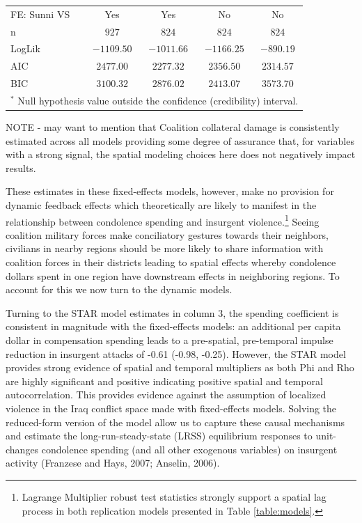 \documentclass[12pt]{article}
\begin{document}
\begin{table}[!h]
\begin{center}
\begin{footnotesize}
\begin{tabular}{l c c c c}
FE: Sunni VS                & Yes               & Yes               & No                & No                  \\
n                           & $927$             & $824$             & $824$             & $824$               \\
LogLik                      & $-1109.50$        & $-1011.66$        & $-1166.25$        & $-890.19$           \\
AIC                         & $2477.00$         & $2277.32$         & $2356.50$         & $2314.57$           \\
BIC                         & $3100.32$         & $2876.02$         & $2413.07$         & $3573.70$           \\
\bottomrule
\multicolumn{5}{l}{\tiny{$^*$ Null hypothesis value outside the confidence (credibility) interval.}}
\end{tabular}
\end{footnotesize}
\end{center}
\end{table}

NOTE - may want to mention that Coalition collateral damage is consistently estimated across all models providing some degree of assurance that, for variables with a strong signal, the spatial modeling choices here does not negatively impact results.

These estimates in these fixed-effects models, however, make no provision for dynamic feedback effects which theoretically are likely to manifest in the relationship between condolence spending and insurgent violence.\footnote{Lagrange Multiplier robust test statistics strongly support a spatial lag process in both replication models presented in Table \ref{table:models}.} Seeing coalition military forces make conciliatory gestures towards their neighbors, civilians in nearby regions should be more likely to share information with coalition forces in their districts leading to spatial effects whereby condolence dollars spent in one region have downstream effects in neighboring regions. To account for this we now turn to the dynamic models.

Turning to the STAR model estimates in column 3, the spending coefficient is consistent in magnitude with the fixed-effects models: an additional per capita dollar in compensation spending leads to a pre-spatial, pre-temporal impulse reduction in insurgent attacks of -0.61 (-0.98, -0.25). However, the STAR model provides strong evidence of spatial and temporal multipliers as both Phi and Rho are highly significant and positive indicating positive spatial and temporal autocorrelation. This provides evidence against the assumption of localized violence in the Iraq conflict space made with fixed-effects models. Solving the reduced-form version of the model allow us to capture these causal mechanisms and estimate the long-run-steady-state (LRSS) equilibrium responses to unit-changes condolence spending (and all other exogenous variables) on insurgent activity (Franzese and Hays, 2007; Anselin, 2006).
\end{document}
